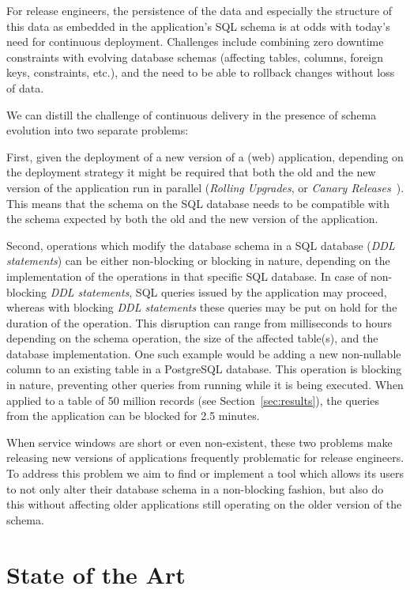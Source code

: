 \documentclass[conference]{IEEEtran}
\begin{document}
For release engineers, the persistence of the data and especially the structure of this data as embedded in the application's SQL schema is at odds with today's need for continuous deployment. Challenges include combining zero downtime constraints with evolving database schemas (affecting tables, columns, foreign keys, constraints, etc.), and the need to be able to rollback changes without loss of data.

We can distill the challenge of continuous delivery in the presence of schema evolution into two separate problems:

First, given the deployment of a new version of a (web) application, depending on the deployment strategy it might be required that both the old and the new version of the application run in parallel (\textit{Rolling Upgrades}, or \textit{Canary Releases}~\cite{Humble:2010:CDR:1869904}). This means that the schema on the SQL database needs to be compatible with the schema expected by both the old and the new version of the application.

Second, operations which modify the database schema in a SQL database (\textit{DDL statements}) can be either non-blocking or blocking in nature, depending on the implementation of the operations in that specific SQL database. In case of non-blocking \textit{DDL statements}, SQL queries issued by the application may proceed, whereas with blocking \textit{DDL statements} these queries may be put on hold for the duration of the operation. This disruption can range from milliseconds to hours depending on the schema operation, the size of the affected table(s), and the database implementation. One such example would be adding a new non-nullable column to an existing table in a PostgreSQL database. This operation is blocking in nature, preventing other queries from running while it is being executed. When applied to a table of 50 million records (see Section~\ref{sec:results}), the queries from the application can be blocked for 2.5 minutes.


When service windows are short or even non-existent, these two problems make releasing new versions of applications frequently problematic for release engineers. To address this problem we aim to find or implement a tool which allows its users to not only alter their database schema in a non-blocking fashion, but also do this without affecting older applications still operating on the older version of the schema.

\section{State of the Art} %
\end{document}
